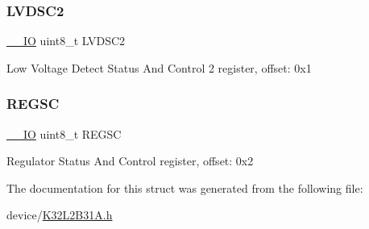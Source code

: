 \subsubsection{\texorpdfstring{LVDSC2}{LVDSC2}}
{\footnotesize\ttfamily \mbox{\hyperlink{core__cm0plus_8h_aec43007d9998a0a0e01faede4133d6be}{\+\_\+\+\_\+\+IO}} uint8\+\_\+t L\+V\+D\+S\+C2}

Low Voltage Detect Status And Control 2 register, offset\+: 0x1 \mbox{\label{struct_p_m_c___type_ac2fc2acedfe2248d41dfbaaccd2a582e}} 
\subsubsection{\texorpdfstring{REGSC}{REGSC}}
{\footnotesize\ttfamily \mbox{\hyperlink{core__cm0plus_8h_aec43007d9998a0a0e01faede4133d6be}{\+\_\+\+\_\+\+IO}} uint8\+\_\+t R\+E\+G\+SC}

Regulator Status And Control register, offset\+: 0x2 

The documentation for this struct was generated from the following file\+:\begin{DoxyCompactItemize}
\item 
device/\mbox{\hyperlink{_k32_l2_b31_a_8h}{K32\+L2\+B31\+A.\+h}}\end{DoxyCompactItemize}
